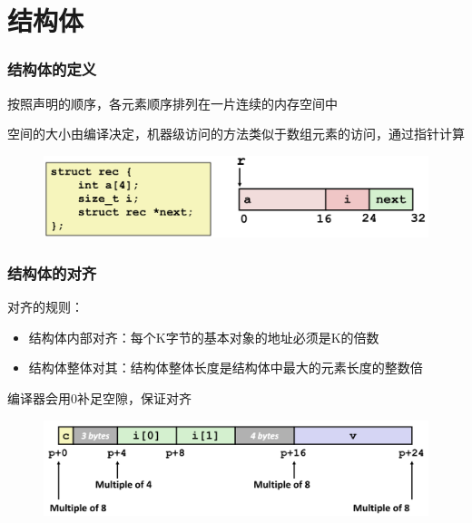 \documentclass[12pt,AutoFakeBold,aspectratio=169,mathserif]{beamer}
\begin{document}
    \section{结构体}

    \begin{frame}
        \frametitle{结构体的定义}
    
        按照声明的顺序，各元素顺序排列在一片连续的内存空间中

        空间的大小由编译决定，机器级访问的方法类似于数组元素的访问，通过指针计算

        \begin{figure}
            \includegraphics[width=.8\textwidth]{figures/strcut.png}
        \end{figure}
    
    \end{frame}

    \begin{frame}
        \frametitle{结构体的对齐}
    
        对齐的规则：
        \begin{itemize}
            \item 结构体内部对齐：每个K字节的基本对象的地址必须是K的倍数
            \item 结构体整体对其：结构体整体长度是结构体中最大的元素长度的整数倍
        \end{itemize}

        编译器会用0补足空隙，保证对齐

        \begin{figure}
            \includegraphics[width=.8\textwidth]{figures/align.png}
        \end{figure}
    
    \end{frame}
\end{document}
